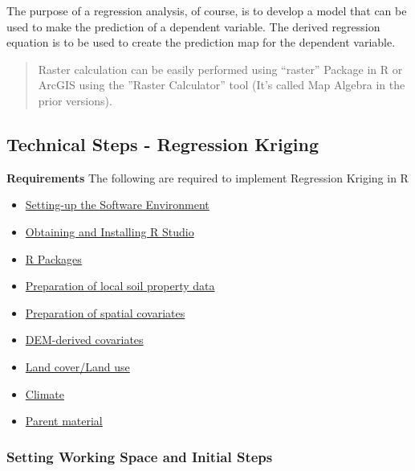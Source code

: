 \documentclass[10pt,b5paper,]{book}
\theoremstyle{definition}
\theoremstyle{definition}
\theoremstyle{definition}
\theoremstyle{remark}
\begin{document}
The purpose of a regression analysis, of course, is to develop a model
that can be used to make the prediction of a dependent variable. The
derived regression equation is to be used to create the prediction map
for the dependent variable.

\begin{quote}
Raster calculation can be easily performed using ``raster'' Package in R
or ArcGIS using the ''Raster Calculator'' tool (It's called Map Algebra
in the prior versions).
\end{quote}

\hypertarget{technical-steps---regression-kriging}{%
\subsection{Technical Steps - Regression
Kriging}\label{technical-steps---regression-kriging}}

\textbf{Requirements} The following are required to implement Regression
Kriging in R

\begin{itemize}
\item
  \href{Latest\%20version\%20of\%20R\%20software,\%20network\%20connection\%20and\%20sufficient\%20RAM,\%20storage\%20capacity}{Setting-up
  the Software Environment}
\item
  \href{Latest\%20version\%20of\%20RStudio}{Obtaining and Installing R
  Studio}
\item
  \href{R\%20packages}{R Packages}
\item
  \href{Point\%20Dataset}{Preparation of local soil property data}
\item
  \href{Environmental\%20predictors}{Preparation of spatial covariates}
\item
  \href{Relief\%20(e.g.\%20DEM,\%20Slope,\%20TWI)}{DEM-derived
  covariates}
\item
  \href{Organism\%20map\%20(e.g.\%20land\%20use,\%20NDVI,\%20land\%20cover)}{Land
  cover/Land use}
\item
  \href{Climate\%20Data\%20(e.g.\%20mean\%20precipitation,\%20mean\%20temperature)}{Climate}
\item
  \href{Parent\%20material\%20(parent\%20material,\%20geology)}{Parent
  material}
\end{itemize}

\hypertarget{setting-working-space-and-initial-steps}{%
\subsubsection{Setting Working Space and Initial
Steps}\label{setting-working-space-and-initial-steps}}
\end{document}
